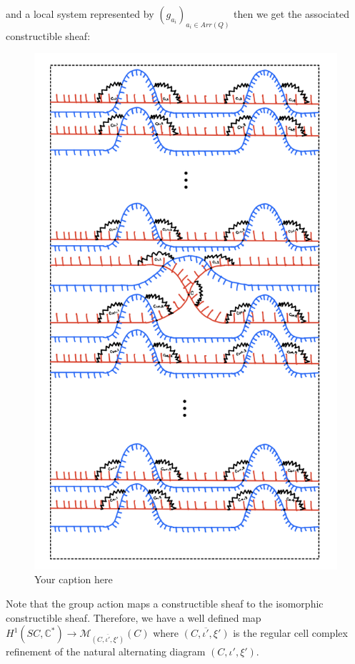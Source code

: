 and a local system represented by 
$(g_{a_i})_{a_i\in Arr(Q)}$
then we get the associated constructible sheaf:
\begin{figure}[H] %
    \centering
    \includegraphics[scale = 0.95]{diagrams/local_systems_on_as_diagrams/4.png} %
    \caption{Your caption here}
    \label{fig:your-label}
\end{figure}

Note that the group action maps a constructible sheaf to the isomorphic constructible sheaf. Therefore, we have a well defined map
$H^1(SC,\mathbb{C}^*)\rightarrow \mathcal{M}_{\overline{(C,\iota',\xi')}}(C)$ where $\overline{(C,\iota',\xi')}$ is the regular cell complex refinement of the natural alternating diagram $(C,\iota',\xi')$.
